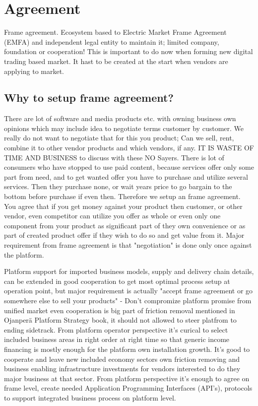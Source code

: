 \section{Agreement}
\label{frame_agreement}
Frame agreement.
Ecosystem based to Electric Market Frame Agreement (EMFA) and independent legal
entity to maintain it; limited company, foundation or cooperation! This is
important to do now when forming new digital trading based market. It hast to
be created at the start when vendors are applying to market.

\subsection{Why to setup frame agreement?}
\label{frame_agreement_why}
There are lot of software and media products etc. with owning business own
opinions which may include idea to negotiate terms customer by customer. We
really do not want to negotiate that for this you product; Can we sell, rent,
combine it to other vendor products and which vendors, if any. IT IS WASTE OF
TIME AND BUSINESS to discuss with these NO Sayers. There is lot of consumers
who have stopped to use paid content, because services offer only some part
from need, and to get wanted offer you have to purchase and utilize several
services. Then they purchase none, or wait years price to go bargain to the
bottom before purchase if even then. Therefore we setup an frame agreement.
You agree that if you get money against your product then customer, or other
vendor, even competitor can utilize you offer as whole or even only one
component from your product as significant part of they own convenience or as
part of created product offer if they wish to do so and get value from it.
Major requirement from frame agreement is that "negotiation" is done only once
against the platform.

Platform support for imported business models, supply and delivery chain
details, can be extended in good cooperation to get most optimal process setup
at operation point, but major requirement is actually "accept frame agreement
or go somewhere else to sell your products" - Don't compromize platform
promise from unified market even cooperation is big part of friction removal
mentioned in Ojanper\"a Platform Strategy book\cite{ojanpera2021platform}, it
should not allowed to steer platfrom to ending sidetrack. From platform
operator perspective it's curical to select included business areas in right
order at right time so that generic income financing is mostly enough for the
platform own installation growth. It's good to cooperate and leave new
included economy sectors own friction removing and business enabling
infrastructure investments for vendors interested to do they major business at
that sector. From platform perspective it's enough to agree on frame level,
create needed Application Programming Interfaces (API's), protocols to support
integrated business process on platform level.

